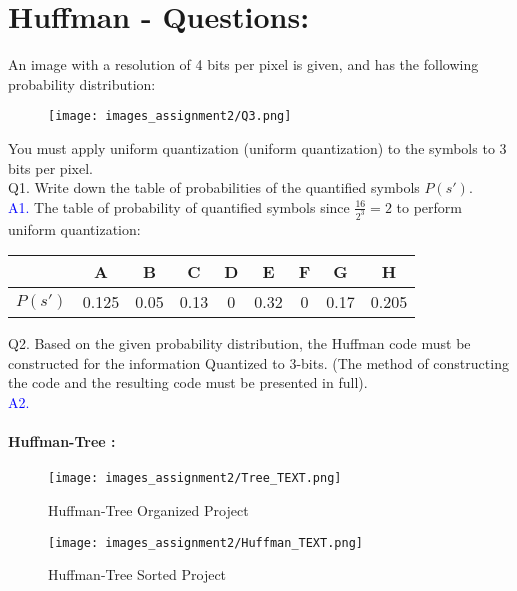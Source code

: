 \documentclass[letterpaper, 12pt]{article}
\begin{document}
\section{Huffman - Questions:}
An image with a resolution of 4 bits per pixel is given, and has the following probability distribution: \\

\begin{figure}[htbp]
    \centering
    \texttt{[image: images\_assignment2/Q3.png]}
    
\end{figure}

You must apply uniform quantization (uniform quantization) to the symbols to 3 bits per pixel. \\
Q1. Write down the table of probabilities of the quantified symbols $P(s')$. \\
\textcolor{blue}{A1.} The table of probability of quantified symbols since $\frac{16}{2^3} = 2  $ to perform uniform quantization: \\

\begin{center}
    \begin{tabular}{|c|c|c|c|c|c|c|c|c|}
        \hline
        & A & B & C & D & E & F & G & H \\
        \hline
        $P(s')$ & 0.125 & 0.05 & 0.13 & 0 & 0.32 & 0 & 0.17 & 0.205 \\
        \hline
    \end{tabular}
\end{center}



Q2. Based on the given probability distribution, the Huffman code must be constructed for the information Quantized to 3-bits. (The method of constructing the code and the resulting code must be presented in full). \\

\textcolor{blue}{A2.} \paragraph{Huffman-Tree :}
\begin{figure}[htbp]
    \centering
    \texttt{[image: images\_assignment2/Tree\_TEXT.png]}
    \caption{Huffman-Tree Organized Project}
    
\end{figure}

\begin{figure}[htbp]
    \centering
    \texttt{[image: images\_assignment2/Huffman\_TEXT.png]}
    \caption{Huffman-Tree Sorted Project}
    
\end{figure}
\end{document}
